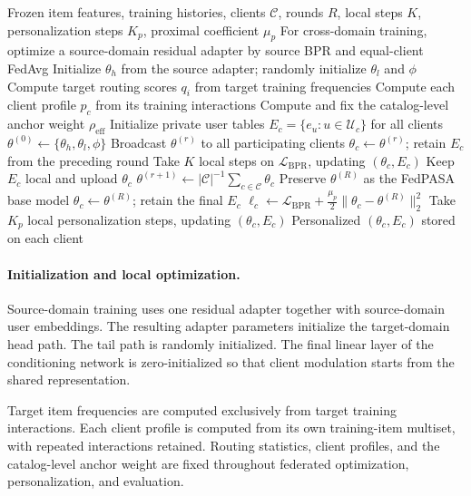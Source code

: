 \begin{algorithm}[t]
\caption{FedPASA training and local personalization}
\label{alg:training}
\footnotesize
\begin{algorithmic}[1]
\Require Frozen item features, training histories, clients $\mathcal{C}$, rounds $R$, local steps $K$, personalization steps $K_p$, proximal coefficient $\mu_p$
\State For cross-domain training, optimize a source-domain residual adapter by source BPR and equal-client FedAvg
\State Initialize $\theta_h$ from the source adapter; randomly initialize $\theta_l$ and $\phi$
\State Compute target routing scores $q_i$ from target training frequencies
\State Compute each client profile $p_c$ from its training interactions
\State Compute and fix the catalog-level anchor weight $\rho_{\mathrm{eff}}$
\State Initialize private user tables $E_c=\{e_u:u\in\mathcal{U}_c\}$ for all clients
\State $\theta^{(0)}\gets\{\theta_h,\theta_l,\phi\}$
    \State Broadcast $\theta^{(r)}$ to all participating clients
        \State $\theta_c\gets\theta^{(r)}$; retain $E_c$ from the preceding round
        \State Take $K$ local steps on $\mathcal{L}_{\mathrm{BPR}}$, updating $(\theta_c,E_c)$
        \State Keep $E_c$ local and upload $\theta_c$
    \EndFor
    \State $\theta^{(r+1)}\gets |\mathcal{C}|^{-1}\sum_{c\in\mathcal{C}}\theta_c$
\EndFor
\State Preserve $\theta^{(R)}$ as the FedPASA base model
    \State $\theta_c\gets\theta^{(R)}$; retain the final $E_c$
    \State $\ell_c\gets\mathcal{L}_{\mathrm{BPR}}+\frac{\mu_p}{2}\|\theta_c-\theta^{(R)}\|_2^2$
    \State Take $K_p$ local personalization steps, updating $(\theta_c,E_c)$
\EndFor
\State \Return Personalized $(\theta_c,E_c)$ stored on each client
\end{algorithmic}
\end{algorithm}

\paragraph{Initialization and local optimization.}
Source-domain training uses one residual adapter together with source-domain user embeddings. The resulting adapter parameters initialize the target-domain head path. The tail path is randomly initialized. The final linear layer of the conditioning network is zero-initialized so that client modulation starts from the shared representation.

Target item frequencies are computed exclusively from target training interactions. Each client profile is computed from its own training-item multiset, with repeated interactions retained. Routing statistics, client profiles, and the catalog-level anchor weight are fixed throughout federated optimization, personalization, and evaluation.

